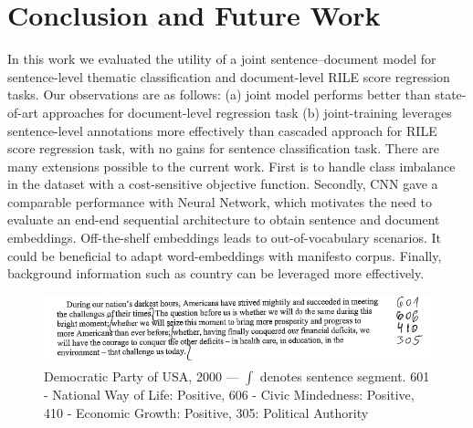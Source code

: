 \documentclass[11pt,a4paper]{article}
\begin{document}
\section{Conclusion and Future Work}
In this work we evaluated the utility of a joint sentence--document model for sentence-level thematic classification and document-level RILE score regression tasks. Our observations are as follows: (a) joint model performs better than state-of-art approaches for document-level regression task (b) joint-training leverages sentence-level annotations more effectively than cascaded approach for RILE score regression task, with no gains for sentence classification task. There are many extensions possible to the current work. First is to handle class imbalance in the dataset with a cost-sensitive objective function. Secondly, CNN gave a comparable performance with Neural Network, which motivates the need to evaluate an end-end sequential architecture to obtain sentence and document embeddings. Off-the-shelf embeddings leads to out-of-vocabulary scenarios. It could be beneficial to  adapt word-embeddings with manifesto corpus. Finally, background information such as country can be leveraged more effectively.


\begin{figure}[!htp]
\includegraphics[width=1\linewidth]{US_Democrats_1.png}
\caption{Democratic Party of USA, 2000 --- $\int$ denotes sentence segment. 601 - National Way of Life: Positive, 606 - Civic Mindedness: Positive, 410 - Economic Growth: Positive, 305: Political Authority}
\label{fig:sub2}
\end{figure}

\end{document}
